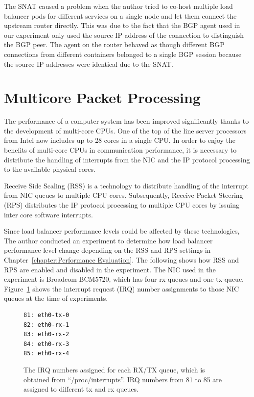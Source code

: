 The SNAT caused a problem when the author tried to co-host multiple load balancer pods for different services on a single node and let them connect the upstream router directly.
This was due to the fact that the BGP agent used in our experiment only used the source IP address of the connection to distinguish the BGP peer.
The agent on the router behaved as though different BGP connections from different containers belonged to a single BGP session because the source IP addresses were identical due to the SNAT.

\FloatBarrier

\section{Multicore Packet Processing}

The performance of a computer system has been improved significantly thanks to the development of multi-core CPUs.
One of the top of the line server processors from Intel now includes up to 28 cores in a single CPU.
In order to enjoy the benefits of multi-core CPUs in communication performance,
it is necessary to distribute the handling of interrupts from the NIC and the IP protocol processing to the available physical cores.

Receive Side Scaling (RSS)\cite{TomHerbert} is a technology 
to distribute handling of the interrupt from NIC queues to multiple CPU cores.
Subsequently, Receive Packet Steering (RPS)\cite{TomHerbert} distributes the IP protocol processing 
to multiple CPU cores by issuing inter core software interrupts.

Since load balancer performance levels could be affected by these technologies,
The author conducted an experiment to determine how load balancer performance level change depending on the RSS and RPS settings in Chapter~\ref{chapter:Performance Evaluation}.
The following shows how RSS and RPS are enabled and disabled in the experiment. 
The NIC used in the experiment is Broadcom BCM5720, which has four rx-queues and one tx-queue.
Figure~\ref{fig:rx-queue} shows the interrupt request (IRQ) number assignments to those NIC queues at the time of experiments.

\begin{figure}[h]
\centering
\begin{minipage}{0.3\columnwidth}
\begin{verbatim}
81: eth0-tx-0
82: eth0-rx-1
83: eth0-rx-2
84: eth0-rx-3
85: eth0-rx-4
\end{verbatim}
\end{minipage}

\par\bigskip
\centering
\begin{minipage}{0.9\columnwidth}
  \caption[The IRQ numbers assigned for each RX/TX queue]{
    The IRQ numbers assigned for each RX/TX queue, which is obtained from \enquote{/proc/interrupts}.
    IRQ numbers from 81 to 85 are assigned to different tx and rx queues.
  }
  \label{fig:rx-queue}
\end{minipage}

\end{figure}

